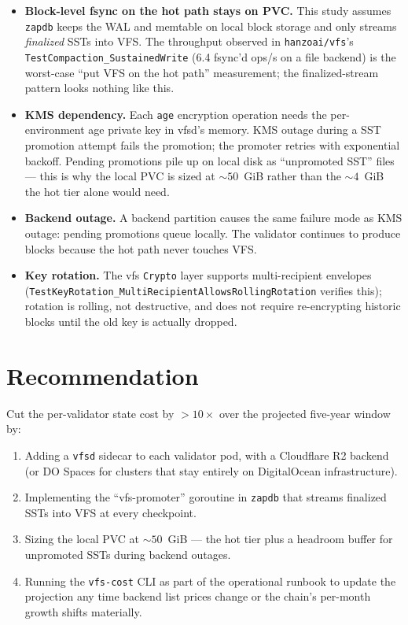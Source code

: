 \documentclass[11pt,a4paper]{article}
\begin{document}
\begin{itemize}
  \item \textbf{Block-level fsync on the hot path stays on PVC.} This
    study assumes \texttt{zapdb} keeps the WAL and memtable on local
    block storage and only streams \emph{finalized} SSTs into VFS.
    The throughput observed in \texttt{hanzoai/vfs}'s
    \texttt{TestCompaction\_SustainedWrite} (6.4 fsync'd ops/s on a
    file backend) is the worst-case ``put VFS on the hot path''
    measurement; the finalized-stream pattern looks nothing like
    this.
  \item \textbf{KMS dependency.} Each \texttt{age} encryption operation
    needs the per-environment age private key in vfsd's memory. KMS
    outage during a SST promotion attempt fails the promotion; the
    promoter retries with exponential backoff. Pending promotions
    pile up on local disk as ``unpromoted SST'' files --- this is
    why the local PVC is sized at $\sim 50$~GiB rather than the
    $\sim 4$~GiB the hot tier alone would need.
  \item \textbf{Backend outage.} A backend partition causes the same
    failure mode as KMS outage: pending promotions queue locally.
    The validator continues to produce blocks because the hot path
    never touches VFS.
  \item \textbf{Key rotation.} The vfs \texttt{Crypto} layer supports
    multi-recipient envelopes
    (\texttt{TestKeyRotation\_MultiRecipientAllowsRollingRotation}
    verifies this); rotation is rolling, not destructive, and does
    not require re-encrypting historic blocks until the old key is
    actually dropped.
\end{itemize}

\section{Recommendation}

Cut the per-validator state cost by $> 10\times$ over the projected
five-year window by:

\begin{enumerate}[noitemsep]
  \item Adding a \texttt{vfsd} sidecar to each validator pod, with a
    Cloudflare R2 backend (or DO Spaces for clusters that stay
    entirely on DigitalOcean infrastructure).
  \item Implementing the ``vfs-promoter'' goroutine in
    \texttt{zapdb} that streams finalized SSTs into VFS at every
    checkpoint.
  \item Sizing the local PVC at $\sim 50$~GiB --- the hot tier plus a
    headroom buffer for unpromoted SSTs during backend outages.
  \item Running the \texttt{vfs-cost} CLI as part of the operational
    runbook to update the projection any time backend list prices
    change or the chain's per-month growth shifts materially.
\end{enumerate}
\end{document}
